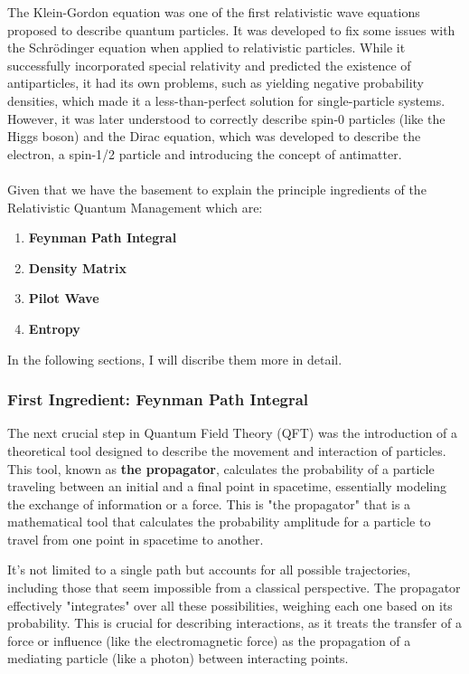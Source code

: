 \documentclass{article}
\begin{document}
The Klein-Gordon equation was one of the first relativistic wave equations proposed to describe quantum particles. It was developed to fix some issues with the Schrödinger equation when applied to relativistic particles. While it successfully incorporated special relativity and predicted the existence of antiparticles, it had its own problems, such as yielding negative probability densities, which made it a less-than-perfect solution for single-particle systems. However, it was later understood to correctly describe spin-0 particles (like the Higgs boson) and the Dirac equation, which was developed to describe the electron, a spin-1/2 particle and introducing the concept of antimatter.\\\\
Given that we have the basement to explain the principle ingredients of the Relativistic Quantum Management which are: 
\begin{enumerate}
  \item \textbf{Feynman Path Integral}
  \item \textbf{Density Matrix}
  \item \textbf{Pilot Wave}
  \item \textbf{Entropy}
\end{enumerate}
In the following sections, I will discribe them more in detail.
\newpage
\subsubsection*{First Ingredient: Feynman Path Integral}
The next crucial step in Quantum Field Theory (QFT) was the introduction of a theoretical tool designed to describe the movement and interaction of particles. This tool, known as \textbf{the propagator}, calculates the probability of a particle traveling between an initial and a final point in spacetime, essentially modeling the exchange of information or a force. This is "the propagator" that is a mathematical tool that calculates the probability amplitude for a particle to travel from one point in spacetime to another. 

It's not limited to a single path but accounts for all possible trajectories, including those that seem impossible from a classical perspective. The propagator effectively "integrates" over all these possibilities, weighing each one based on its probability. This is crucial for describing interactions, as it treats the transfer of a force or influence (like the electromagnetic force) as the propagation of a mediating particle (like a photon) between interacting points.
\end{document}
